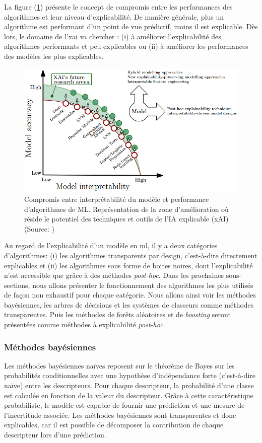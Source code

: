 La figure (\ref{fig:xai-research}) présente le concept de compromis entre les performances des algorithmes et leur niveau d'explicabilité. De manière générale, plus un algorithme est performant d'un point de vue prédictif, moins il est explicable. Dès lors, le domaine de l'\gls{xai} va chercher : (i) à améliorer l'explicabilité des algorithmes performants et peu explicables ou (ii) à améliorer les performances des modèles les plus explicables.
\begin{figure}[!ht]
 \centering
 \includegraphics[width=1\textwidth]{figures/xai-research.png}
 \caption[Compromis entre interprétabilité et performances des algo de ML]{Compromis entre interprétabilité du modèle et performance d'algorithmes de ML. Représentation de la zone d'amélioration où réside le potentiel des techniques et outils de l'IA explicable (xAI) (Source: \cite{arrieta_explainable_2019})}
 \label{fig:xai-research}
\end{figure}

Au regard de l'explicabilité d'un modèle en \gls{ml}, il y a deux catégories d'algorithmes: (i) les algorithmes transparents par design, c'est-à-dire directement explicables et (ii) les algorithmes sous forme de boites noires, dont l'explicabilité n'est accessible que grâce à des méthodes \textit{post-hoc}. Dans les prochaines sous-sections, nous allons présenter le fonctionnement des algorithmes les plus utilisés de façon non exhaustif pour chaque catégorie. Nous allons ainsi voir les méthodes bayésiennes, les arbres de décisions et les systèmes de classeurs comme méthodes transparentes. Puis les méthodes de forêts aléatoires et de \textit{boosting} seront présentées comme méthodes à explicabilité \textit{post-hoc}.

\subsubsection{Méthodes bayésiennes}
Les méthodes bayésiennes naïves reposent sur le théorème de Bayes sur les probabilités conditionnelles avec une hypothèse d'indépendance forte (c'est-à-dire naïve) entre les descripteurs. Pour chaque descripteur, la probabilité d'une classe est calculée en fonction de la valeur du descripteur. Grâce à cette caractéristique probabiliste, le modèle est capable de fournir une prédiction et une mesure de l'incertitude associée. Les méthodes bayésiennes sont transparentes et donc explicables, car il est possible de décomposer la contribution de chaque descripteur lors d'une prédiction.

